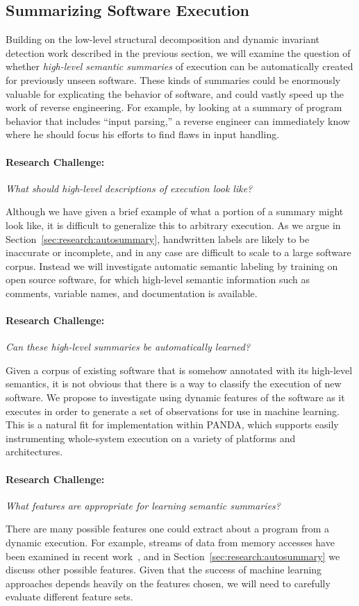 \documentclass[letterpaper,twoside,11pt,headings=small]{scrartcl}
\newcommand{\dynamicsys}{\textsc{PANDA}\xspace}
\newcommand{\challenge}[1]{\paragraph{Research Challenge:} \emph{#1}}
\begin{document}
\subsection{Summarizing Software Execution}
\label{sec:overview:autosummary}

Building on the low-level structural decomposition and dynamic invariant
detection work described in the previous section, we will examine the question
of whether \emph{high-level semantic summaries} of execution can be
automatically created for previously unseen software. These kinds of summaries
could be enormously valuable for explicating the behavior of software, and
could vastly speed up the work of reverse engineering. For example, by looking
at a summary of program behavior that includes ``input parsing,'' a reverse
engineer can immediately know where he should focus his efforts to find flaws
in input handling.

\challenge{What should high-level descriptions of execution look like?}

Although we have given a brief example of what a portion of a summary might
look like, it is difficult to generalize this to arbitrary execution. As we
argue in Section~\ref{sec:research:autosummary}, handwritten labels are likely
to be inaccurate or incomplete, and in any case are difficult to scale to
a large software corpus. Instead we will investigate automatic semantic
labeling by training on open source software, for which high-level semantic
information such as comments, variable names, and documentation is available.

\challenge{Can these high-level summaries be automatically learned?}

Given a corpus of existing software that is somehow annotated with its
high-level semantics, it is not obvious that there is a way to classify the
execution of new software. We propose to investigate using dynamic features of
the software as it executes in order to generate a set of observations for use
in machine learning. This is a natural fit for implementation within
\dynamicsys, which supports easily instrumenting whole-system execution on a
variety of platforms and architectures.

\challenge{What features are appropriate for learning semantic summaries?}

There are many possible features one could extract about a program from a
dynamic execution. For example, streams of data from memory accesses have
been examined in recent work~\cite{dolangavitt:2013:tzb}, and in
Section~\ref{sec:research:autosummary} we discuss other possible features.
Given that the success of machine learning approaches depends heavily on the
features chosen, we will need to carefully evaluate different feature sets.
\end{document}
